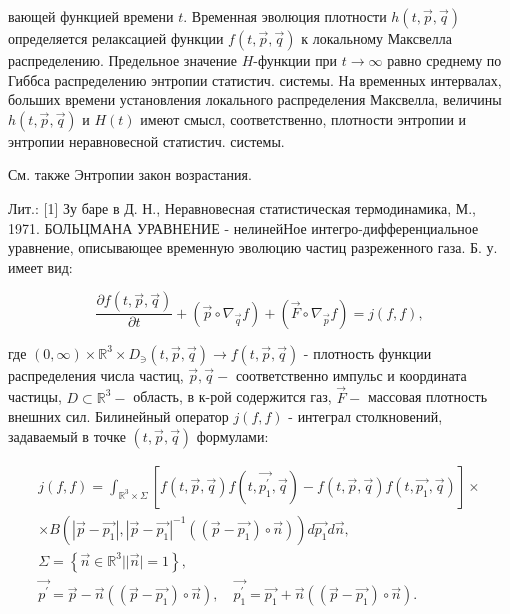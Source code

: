 \documentclass[10pt]{article}
\begin{document}
вающей функцией времени $t$. Временная эволюция плотности $h(t, \vec{p}, \vec{q})$ определяется релаксацией функции $f(t, \vec{p}, \vec{q})$ к локальному Максвелла распределению. Предельное значение $H$-функции при $t \rightarrow \infty$ равно среднему по Гиббса распределению энтропии статистич. системы. На временных интервалах, больших времени установления локального распределения Максвелла, величины $h(t, \vec{p}, \vec{q})$ и $H(t)$ имеют смысл, соответственно, плотности энтропии и энтропии неравновесной статистич. системы.



См. также Энтропии закон возрастания.



Лит.: [1] Зу баре в Д. Н., Неравновесная статистическая термодинамика, М., 1971. БОЛЬЦМАНА УРАВНЕНИЕ - нелинейНое интегро-дифференциальное уравнение, описывающее временную эволюцию частиц разреженного газа. Б. у. имеет вид:



\[

\frac{\partial f(t, \vec{p}, \vec{q})}{\partial t}+\left(\vec{p} \circ \nabla_{\vec{q}} f\right)+\left(\vec{F} \circ \nabla_{\vec{p}} f\right)=j(f, f),

\]



где $(0, \infty) \times \mathbb{R}^{3} \times D_{\ni}(t, \vec{p}, \vec{q}) \rightarrow f(t, \vec{p}, \vec{q})$ - плотность функции распределения числа частиц, $\vec{p}, \vec{q}-$ соответственно импульс и координата частицы, $D \subset \mathbb{R}^{3}-$ область, в к-рой содержится газ, $\vec{F}-$ массовая плотность внешних сил. Билинейный оператор $j(f, f)$ - интеграл столкновений, задаваемый в точке $(t, \vec{p}, \vec{q})$ формулами:



\[

\begin{gathered}

j(f, f)=\int_{\mathbb{R}^{3} \times \Sigma}\left[f(t, \vec{p}, \vec{q}) f\left(t, \overrightarrow{p_{1}^{\prime}}, \vec{q}\right)-f(t, \vec{p}, \vec{q}) f\left(t, \overrightarrow{p_{1}}, \vec{q}\right)\right] \times \\

\times B\left(\left|\vec{p}-\overrightarrow{p_{1}}\right|,\left|\vec{p}-\overrightarrow{p_{1}}\right|^{-1}\left(\left(\vec{p}-\overrightarrow{p_{1}}\right) \circ \vec{n}\right)\right) d \overrightarrow{p_{1}} d \vec{n}, \\

\Sigma=\left\{\vec{n} \in \mathbb{R}^{3}|| \vec{n} \mid=1\right\}, \\

\overrightarrow{p^{\prime}}=\vec{p}-\vec{n}\left(\left(\vec{p}-\overrightarrow{p_{1}}\right) \circ \vec{n}\right), \quad \overrightarrow{p_{1}^{\prime}}=\overrightarrow{p_{1}}+\vec{n}\left(\left(\vec{p}-\overrightarrow{p_{1}}\right) \circ \vec{n}\right) .

\end{gathered}

\]
\end{document}
